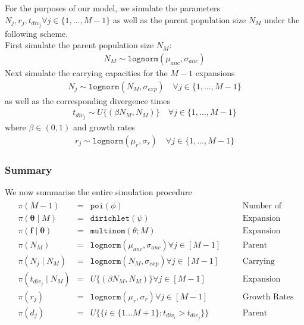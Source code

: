 \documentclass{report}
\theoremstyle{definition}
\begin{document}
For the purposes of our model, we simulate the parameters $N_j, r_j, t_{div_j} \forall j \in \{1,...,M-1\}$ as well as the parent population size $N_{M}$ under the following scheme.\\
First simulate the parent population size $N_{M}$:
\begin{gather}
N_{M} \sim \texttt{lognorm}(\mu_{anc}, \sigma_{anc})
\end{gather}
Next simulate the carrying capacities for the $M-1$ expansions
\begin{gather}
N_{j} \sim \texttt{lognorm}(N_{M}, \sigma_{exp}) \quad\forall j \in \{1,...,M-1\}
\end{gather}
as well as the corresponding divergence times
\begin{gather}
t_{div_j} \sim U\{(\beta N_{M}, N_{M})\} \quad\forall j \in \{1,...,M-1\}
\end{gather}
where $\beta \in (0,1)$
and growth rates
\begin{gather}
r_{j} \sim \texttt{lognorm}(\mu_r, \sigma_r) \quad\forall j \in \{1,...,M-1\}
\end{gather} 
\subsubsection{Summary}
We now summarise the entire simulation procedure
\begin{gather}
\begin{aligned}
&\pi(M-1) &=& \texttt{poi}(\phi) &\quad&\text{Number of expansions} \\
&\pi(\pmb\theta\mid M) &=& \texttt{dirichlet}(\psi) &\quad&\text{Expansion Membership Probabilities} \\
&\pi(\mathbf{f\mid\pmb\theta}) &=& \texttt{multinom}(\theta; M) &\quad&\text{Expansion Membership Assignment} \\
&\pi(N_M) &=& \texttt{lognorm}(\mu_{anc},\sigma_{anc})\forall j \in [M-1] &\quad&\text{Parent Population Size}\\
&\pi(N_j\mid N_{M}) &=& \texttt{lognorm}(N_{M},\sigma_{exp})\forall j \in [M-1] &\quad&\text{Carrying Capacities}\\
&\pi(t_{div_j}\mid N_{M}) &=& U\{(\beta N_{M},N_{M})\}\forall j \in [M-1] &\quad&\text{Expansion Times}\\
&\pi(r_j) &=& \texttt{lognorm}(\mu_{r},\sigma_{r})\forall j \in [M-1] &\quad&\text{Growth Rates}\\
&\pi(d_j) &=& U\{\{i\in \{1 ... M+1\} : t_{div_i} > t_{div_j}\}\} &\quad&\text{Parent Populations}\\
\end{aligned}
\end{gather}
\end{document}
